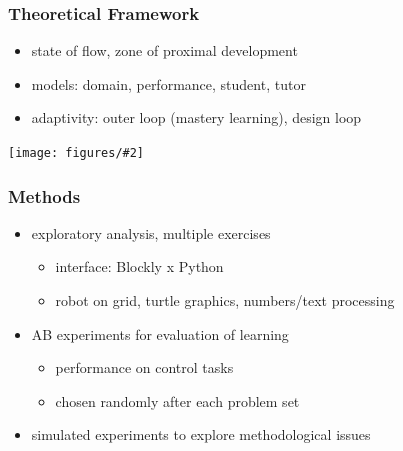 \documentclass[bigger]{beamer}
\newcommand{\img}[2]{
  \begin{center}
    \texttt{[image: figures/\#2]}
  \end{center}
}
\begin{document}
\begin{frame}
  \frametitle{Theoretical Framework}

  \begin{itemize}
  \item state of flow, zone of proximal development

  \item models: domain, performance, student, tutor

  \item adaptivity: outer loop (mastery learning), design loop %
  \end{itemize}

  \img{0.9}{robomission-tutor-model}

\end{frame}


\begin{frame}
  \frametitle{Methods}

  \begin{itemize}
  \item exploratory analysis, multiple exercises
    \begin{itemize}
    \item interface: Blockly x Python
    \item robot on grid, turtle graphics, numbers/text processing
    \end{itemize}

  \item AB experiments for evaluation of learning
    \begin{itemize}
    \item performance on control tasks
    \item chosen randomly after each problem set
    \end{itemize}

  \item simulated experiments to explore methodological issues
  \end{itemize}

\end{frame}
\end{document}
